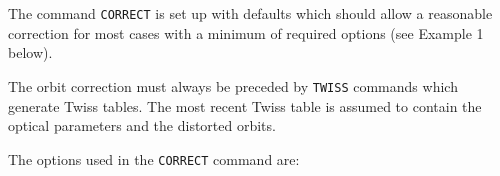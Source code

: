 

The command {\tt CORRECT} is set up with defaults which should allow a
reasonable correction for most cases with a minimum of required options
(see Example 1 below).  

The orbit correction must always be preceded by {\tt TWISS} commands  which
generate Twiss tables. The most recent Twiss table is assumed to contain
the optical parameters and the distorted orbits. 

The options used in the {\tt CORRECT} command are: 


